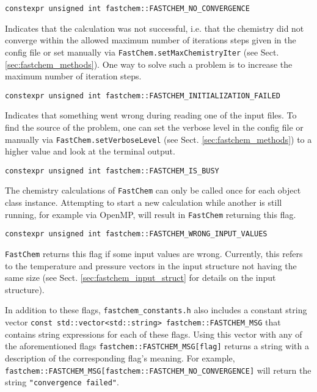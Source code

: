 \documentclass[numbers=noenddot]{fcmanual}
\newcommand{\fc}{\texttt{FastChem}\xspace}
\begin{document}
\bigbreak

\lstinline!constexpr unsigned int fastchem::FASTCHEM_NO_CONVERGENCE!
\begin{addmargin}[25pt]{0pt}
  Indicates that the calculation was not successful, i.e. that the chemistry did not converge within the allowed maximum number of iterations steps given in the config file or set manually via \lstinline!FastChem.setMaxChemistryIter! (see Sect. \ref{sec:fastchem_methods}). One way to solve such a problem is to increase the maximum number of iteration steps.
\end{addmargin}

\bigbreak

\lstinline!constexpr unsigned int fastchem::FASTCHEM_INITIALIZATION_FAILED!
\begin{addmargin}[25pt]{0pt}
  Indicates that something went wrong during reading one of the input files. To find the source of the problem, one can set the verbose level in the config file or manually via \lstinline!FastChem.setVerboseLevel! (see Sect. \ref{sec:fastchem_methods}) to a higher value and look at the terminal output.
\end{addmargin}

\bigbreak

\lstinline!constexpr unsigned int fastchem::FASTCHEM_IS_BUSY!
\begin{addmargin}[25pt]{0pt}
  The chemistry calculations of \fc can only be called once for each object class instance. Attempting to start a new calculation while another is still running, for example via OpenMP, will result in \fc returning this flag.
\end{addmargin}

\bigbreak

\lstinline!constexpr unsigned int fastchem::FASTCHEM_WRONG_INPUT_VALUES!
\begin{addmargin}[25pt]{0pt}
  \fc returns this flag if some input values are wrong. Currently, this refers to the temperature and pressure vectors in the input structure not having the same size (see Sect. \ref{sec:fastchem_input_struct} for details on the input structure). \\
\end{addmargin}

In addition to these flags, \verb|fastchem_constants.h| also includes a constant string vector \lstinline!const std::vector<std::string> fastchem::FASTCHEM_MSG! that contains string expressions for each of these flags. Using this vector with any of the aforementioned flags \lstinline!fastchem::FASTCHEM_MSG[flag]! returns a string with a description of the corresponding flag's meaning. For example, \lstinline!fastchem::FASTCHEM_MSG[fastchem::FASTCHEM_NO_CONVERGENCE]! will return the string \lstinline!"convergence failed"!.
\end{document}
